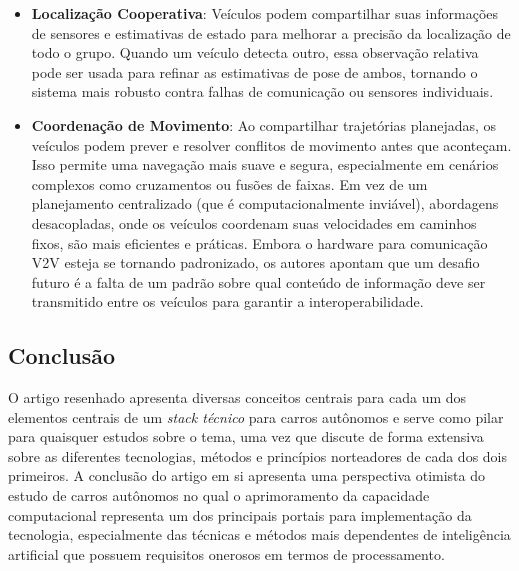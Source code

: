 \begin{itemize}
    \item \textbf{Localização Cooperativa}: Veículos podem compartilhar suas informações de sensores e estimativas de estado para melhorar a precisão da localização de todo o grupo. Quando um veículo detecta outro, essa observação relativa pode ser usada para refinar as estimativas de pose de ambos, tornando o sistema mais robusto contra falhas de comunicação ou sensores individuais.
    \item \textbf{Coordenação de Movimento}: Ao compartilhar trajetórias planejadas, os veículos podem prever e resolver conflitos de movimento antes que aconteçam. Isso permite uma navegação mais suave e segura, especialmente em cenários complexos como cruzamentos ou fusões de faixas. Em vez de um planejamento centralizado (que é computacionalmente inviável), abordagens desacopladas, onde os veículos coordenam suas velocidades em caminhos fixos, são mais eficientes e práticas. Embora o hardware para comunicação V2V esteja se tornando padronizado, os autores apontam que um desafio futuro é a falta de um padrão sobre qual conteúdo de informação deve ser transmitido entre os veículos para garantir a interoperabilidade.
\end{itemize}

\subsection{Conclusão}

O artigo resenhado apresenta diversas conceitos centrais para cada um dos elementos centrais de um \textit{stack técnico} para carros autônomos e serve como pilar para quaisquer estudos sobre o tema, uma vez que discute de forma extensiva sobre as diferentes tecnologias, métodos e princípios norteadores de cada dos dois primeiros. A conclusão do artigo em si apresenta uma perspectiva otimista do estudo de carros autônomos no qual o aprimoramento da capacidade computacional representa um dos principais portais para implementação da tecnologia, especialmente das técnicas e métodos mais dependentes de inteligência artificial que possuem requisitos onerosos em termos de processamento.